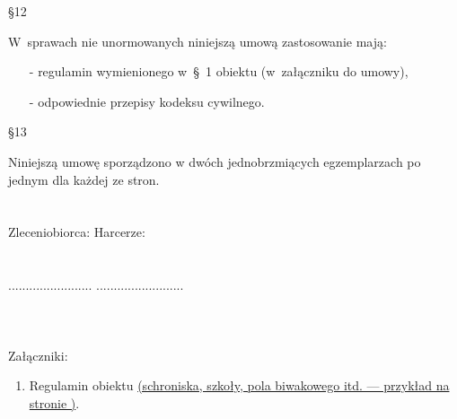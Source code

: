 \begin{center}\S 12\end{center}
W~sprawach nie unormowanych niniejszą umową zastosowanie mają:
\begin{itemize}
\item[-] regulamin wymienionego w~\S~1 obiektu (w~załączniku do umowy),
\item[-] odpowiednie przepisy kodeksu cywilnego.
\end{itemize}
\newpage
\begin{center}\S 13\end{center}
Niniejszą umowę sporządzono w dwóch jednobrzmiących egzemplarzach po jednym dla każdej ze stron.
\\
\\
\\
\indent \hspace{1cm} Zleceniobiorca: \hspace{5cm} Harcerze:\\
\\
\\
\indent \hspace{1cm} ........................ \hspace{4.5cm} .........................\\
\\
\\
\\
Załączniki:
\begin{enumerate}
\item Regulamin obiektu \uline{(schroniska, szkoły, pola biwakowego itd. --- przykład na stronie \pageref{regulamin-schroniska})}.
\end{enumerate}
\newpage
